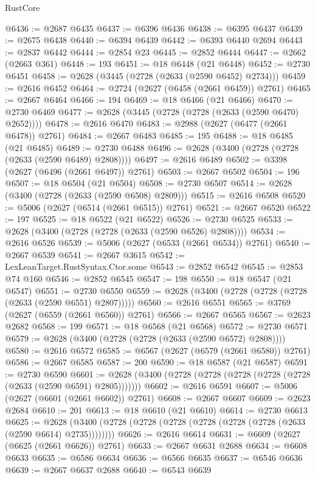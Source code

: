 \begin{lexlean}{RustCore}
\begin{coremodule}
@6436 := @2687 @6435
@6437 := @6396 @6436
@6438 := @6395 @6437
@6439 := @2675 @6438
@6440 := @6394 @6439
@6442 := @6393 @6440 @2694
@6443 := @2837 @6442
@6444 := @2854 @23
@6445 := @2852 @6444
@6447 := @2662 (@2663 @361)
@6448 := 193
@6451 := @18 @6448 (@21 @6448)
@6452 := @2730 @6451
@6458 := @2628 (@3445 (@2728 (@2633 (@2590 @6452) @2734)))
@6459 := @2616 @6452
@6464 := @2724 (@2627 (@6458 (@2661 @6459)) @2761)
@6465 := @2667 @6464
@6466 := 194
@6469 := @18 @6466 (@21 @6466)
@6470 := @2730 @6469
@6477 := @2628 (@3445 (@2728 (@2728 (@2633 (@2590 @6470) @2652))))
@6478 := @2616 @6470
@6483 := @2988 (@2627 (@6477 (@2661 @6478)) @2761)
@6484 := @2667 @6483
@6485 := 195
@6488 := @18 @6485 (@21 @6485)
@6489 := @2730 @6488
@6496 := @2628 (@3400 (@2728 (@2728 (@2633 (@2590 @6489) @2808))))
@6497 := @2616 @6489
@6502 := @3398 (@2627 (@6496 (@2661 @6497)) @2761)
@6503 := @2667 @6502
@6504 := 196
@6507 := @18 @6504 (@21 @6504)
@6508 := @2730 @6507
@6514 := @2628 (@3400 (@2728 (@2633 (@2590 @6508) @2809)))
@6515 := @2616 @6508
@6520 := @5006 (@2627 (@6514 (@2661 @6515)) @2761)
@6521 := @2667 @6520
@6522 := 197
@6525 := @18 @6522 (@21 @6522)
@6526 := @2730 @6525
@6533 := @2628 (@3400 (@2728 (@2728 (@2633 (@2590 @6526) @2808))))
@6534 := @2616 @6526
@6539 := @5006 (@2627 (@6533 (@2661 @6534)) @2761)
@6540 := @2667 @6539
@6541 := @2667 @3615
@6542 := LexLeanTarget.RustSyntax.Ctor.some
@6543 := @2852 @6542
@6545 := @2853 @74 @160
@6546 := @2852 @6545
@6547 := 198
@6550 := @18 @6547 (@21 @6547)
@6551 := @2730 @6550
@6559 := @2628 (@3400 (@2728 (@2728 (@2728 (@2633 (@2590 @6551) @2807)))))
@6560 := @2616 @6551
@6565 := @3769 (@2627 (@6559 (@2661 @6560)) @2761)
@6566 := @2667 @6565
@6567 := @2623 @2682
@6568 := 199
@6571 := @18 @6568 (@21 @6568)
@6572 := @2730 @6571
@6579 := @2628 (@3400 (@2728 (@2728 (@2633 (@2590 @6572) @2808))))
@6580 := @2616 @6572
@6585 := @6567 (@2627 (@6579 (@2661 @6580)) @2761)
@6586 := @2667 @6585
@6587 := 200
@6590 := @18 @6587 (@21 @6587)
@6591 := @2730 @6590
@6601 := @2628 (@3400 (@2728 (@2728 (@2728 (@2728 (@2728 (@2633 (@2590 @6591) @2805)))))))
@6602 := @2616 @6591
@6607 := @5006 (@2627 (@6601 (@2661 @6602)) @2761)
@6608 := @2667 @6607
@6609 := @2623 @2684
@6610 := 201
@6613 := @18 @6610 (@21 @6610)
@6614 := @2730 @6613
@6625 := @2628 (@3400 (@2728 (@2728 (@2728 (@2728 (@2728 (@2728 (@2633 (@2590 @6614) @2735))))))))
@6626 := @2616 @6614
@6631 := @6609 (@2627 (@6625 (@2661 @6626)) @2761)
@6633 := @2667 @6631 @2688
@6634 := @6608 @6633
@6635 := @6586 @6634
@6636 := @6566 @6635
@6637 := @6546 @6636
@6639 := @2667 @6637 @2688
@6640 := @6543 @6639

\end{coremodule}
\end{lexlean}
